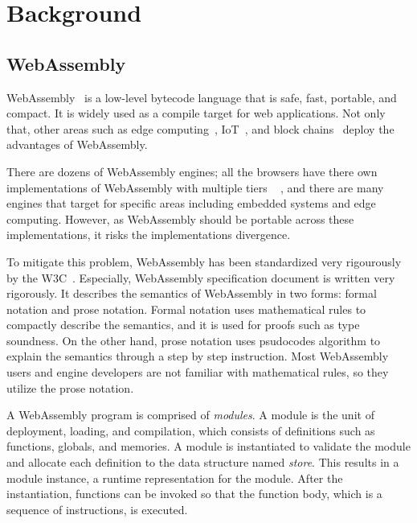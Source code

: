 
\chapter{Background}
\label{ch:background}
\noindent



\section{WebAssembly}
\label{sec:webassembly}


WebAssembly~\cite{wasm} is a low-level bytecode language that is safe, fast,
portable, and compact.
It is widely used as a compile target for web applications.
Not only that, other areas such as edge computing~\cite{wasm-edge},
IoT~\cite{wasm-iot}, and block chains~\cite{wasm-block} deploy the advantages
of WebAssembly.


There are dozens of WebAssembly engines; all the browsers have there own
implementations of WebAssembly with multiple tiers ~\cite{v8}
\cite{spidermonkey} \cite{webkit}, and there are many engines that target for
specific areas including embedded systems and edge computing.
However, as WebAssembly should be portable across these implementations, it risks
the implementations divergence.


To mitigate this problem, WebAssembly has been standardized very rigourously by
the W3C~\cite{wasm-w3c}.
Especially, WebAssembly specification document is written very rigorously.
It describes the semantics of WebAssembly in two forms: formal notation and
prose notation.
Formal notation uses mathematical rules to compactly describe the semantics,
and it is used for proofs such as type soundness.
On the other hand, prose notation uses psudocodes algorithm to explain the
semantics through a step by step instruction.
Most WebAssembly users and engine developers are not familiar with
mathematical rules, so they utilize the prose notation.


A WebAssembly program is comprised of \textit{modules}.
A module is the unit of deployment, loading, and compilation, which consists of
definitions such as functions, globals, and memories.
A module is instantiated to validate the module and allocate each definition to
the data structure named \textit{store}.
This results in a module instance, a runtime representation for the module.
After the instantiation, functions can be invoked so that the function body,
which is a sequence of instructions, is executed.


